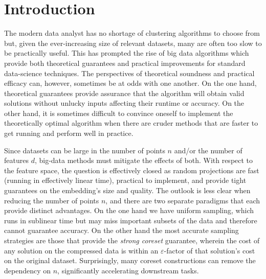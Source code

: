 \section{Introduction}

The modern data analyst has no shortage of clustering algorithms to choose from but, given the ever-increasing size of relevant datasets, many are often
too slow to be practically useful. This has prompted the rise of big data algorithms which provide both theoretical guarantees and
practical improvements for standard data-science techniques. The perspectives
of theoretical soundness and practical efficacy can, however, sometimes be at odds with one another. On the one hand, theoretical guarantees provide assurance that
the algorithm will obtain valid solutions without unlucky inputs affecting their runtime or accuracy. On the other hand, it is sometimes difficult to convince
oneself to implement the theoretically optimal algorithm when there are cruder methods that are faster to get running and perform well in practice.

Since datasets can be large in the number of points $n$ and/or the number of features $d$, big-data methods must mitigate the effects of both.
With respect to the feature space, the question is effectively closed as random projections are fast (running in effectively linear time), practical to
implement, and provide tight guarantees on the embedding's size and quality. The outlook is less clear when reducing the number of points $n$, and there are
two separate paradigms that each provide distinct advantages.  On the one hand we have uniform sampling, which runs in sublinear time but may miss important subsets of
the data and therefore cannot guarantee accuracy.  On the other hand the most accurate sampling strategies are those that provide the \emph{strong coreset}
guarantee, wherein the cost of any solution on the compressed data is within an $\varepsilon$-factor of that solution's cost on the original dataset.
Surprisingly, many coreset constructions can remove the dependency on $n$, significantly accelerating downstream tasks.

